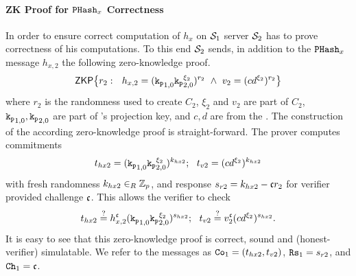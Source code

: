 \paragraph{ZK Proof for $\mathtt{PHash}_x$ Correctness}
In order to ensure correct computation of $h_x$ on $\mathcal{S}_1$ server $\mathcal{S}_2$ has to prove correctness of his computations.
To this end $\mathcal{S}_2$ sends, in addition to the $\mathtt{PHash}_x$ message $h_{x,2}$ the following zero-knowledge proof.
\begin{equation}
    \mathsf{ZKP}\big\{ r_2:~~ h_{x,2} = (\mathtt{k_p}_{1,0} \mathtt{k_p}_{2,0}^{\xi_2})^{r_2} ~ \wedge ~ v_2=(cd^{\xi_2})^{r_2} \big\}
\end{equation}
where $r_2$ is the randomness used to create $C_2$, $\xi_2$ and $v_2$ are part of $C_2$, $\mathtt{k_p}_{1,0},\mathtt{k_p}_{2,0}$ are part of \Client's projection key, and $c,d$ are from the \crs.
The construction of the according zero-knowledge proof is straight-forward. 
The prover computes commitments
\[ t_{hx2} = (\mathtt{k_p}_{1,0} \mathtt{k_p}_{2,0}^{\xi_2})^{k_{hx2}}; ~~ t_{v2} = (cd^{\xi_2})^{k_{hx2}} \]
with fresh randomness $k_{hx2}\in_R\mathbb{Z}_p$, and response $s_{r2} = k_{hx2} - \mathfrak{c} r_2$ for verifier provided challenge $\mathfrak{c}$.
This allows the verifier to check
\[ t_{hx2} \stackrel{?}{=} h_{x,2}^\mathfrak{c} (\mathtt{k_p}_{1,0} \mathtt{k_p}_{2,0}^{\xi_2})^{s_{hx2}}; ~~ t_{v2} \stackrel{?}{=} v_2^\mathfrak{c} (cd^{\xi_2})^{s_{hx2}}. \]
It is easy to see that this zero-knowledge proof is correct, sound and (honest-verifier) simulatable.
We refer to the messages as $\mathtt{Co}_{1}=(t_{hx2}, t_{v2})$, $\mathtt{Rs}_{1}=s_{r2}$, and $\mathtt{Ch}_{1}=\mathfrak{c}$.

